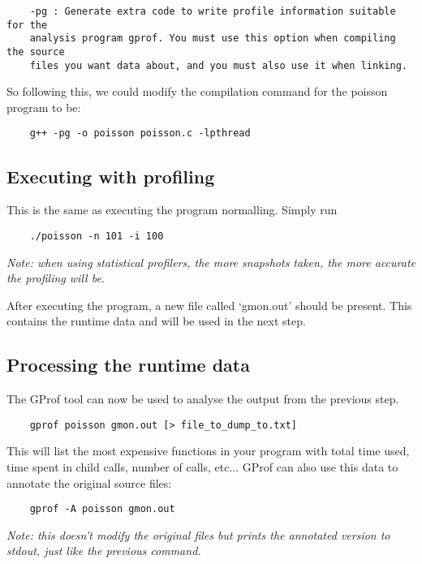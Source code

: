 \documentclass[a4paper,11pt]{article}
\begin{document}
\begin{verbatim}
    -pg : Generate extra code to write profile information suitable for the
    analysis program gprof. You must use this option when compiling the source
    files you want data about, and you must also use it when linking.
\end{verbatim}

So following this, we could modify the compilation command for the poisson
program to be:
\begin{verbatim}
    g++ -pg -o poisson poisson.c -lpthread 
\end{verbatim}

\subsection{Executing with profiling}

This is the same as executing the program normalling. Simply run
\begin{verbatim}
    ./poisson -n 101 -i 100
\end{verbatim}

\emph{Note: when using statistical profilers, the more snapshots taken, the more
accurate the profiling will be.}

After executing the program, a new file called `gmon.out' should be present.
This contains the runtime data and will be used in the next step.

\subsection{Processing the runtime data}

The GProf tool can now be used to analyse the output from the previous step.

\begin{verbatim}
    gprof poisson gmon.out [> file_to_dump_to.txt]
\end{verbatim}

This will list the most expensive functions in your program with total time
used, time spent in child calls, number of calls, etc... GProf can also use this
data to annotate the original source files:

\begin{verbatim}
    gprof -A poisson gmon.out
\end{verbatim}

\emph{Note: this doesn't modify the original files but prints the annotated
version to stdout, just like the previous command.}
\end{document}
